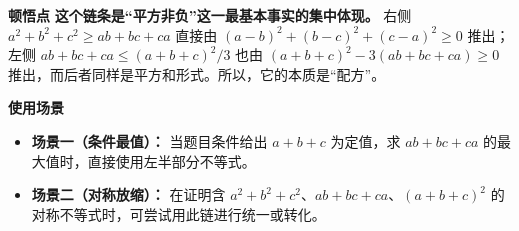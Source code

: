 \begin{explanationbox}
\medskip
\textbf{\textcolor{CExplanation}{顿悟点}}
\textbf{这个链条是“平方非负”这一最基本事实的集中体现。} 右侧 $a^2+b^2+c^2 \ge ab+bc+ca$ 直接由 $(a-b)^2+(b-c)^2+(c-a)^2 \ge 0$ 推出；左侧 $ab+bc+ca \le (a+b+c)^2/3$ 也由 $(a+b+c)^2 - 3(ab+bc+ca) \ge 0$ 推出，而后者同样是平方和形式。所以，它的本质是“配方”。

\medskip
\textbf{\textcolor{CExplanation}{使用场景}}
\begin{itemize}[leftmargin=*, itemsep=0.5em, topsep=0.4em]
    \item \textbf{场景一（条件最值）：} 当题目条件给出 $a+b+c$ 为定值，求 $ab+bc+ca$ 的最大值时，直接使用左半部分不等式。
    \item \textbf{场景二（对称放缩）：} 在证明含 $a^2+b^2+c^2$、$ab+bc+ca$、$(a+b+c)^2$ 的对称不等式时，可尝试用此链进行统一或转化。
\end{itemize}
\end{explanationbox}
